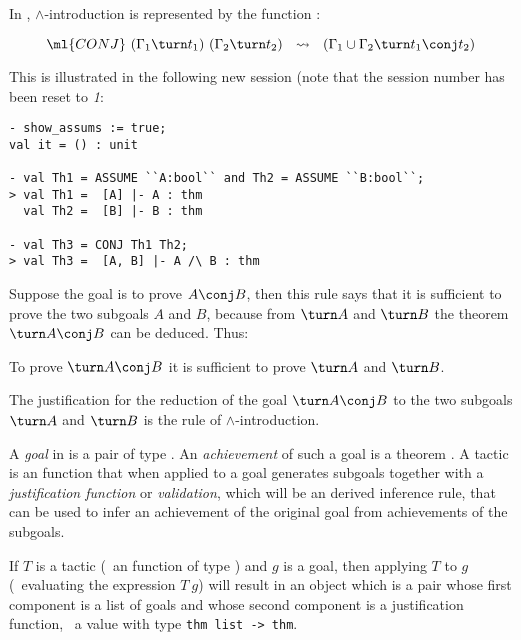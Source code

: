 \noindent In \HOL,  $\wedge$-introduction is  represented by  the \ML{} function
:

\[\ml{CONJ}\ (\Gamma_1\turn t_1)\ (\Gamma_2\turn t_2) \ \ \leadsto\
\ (\Gamma_1\cup\Gamma_2\turn  t_1\conj  t_2)\]

\noindent  This  is   illustrated  in  the
following new session (note that the session number has been reset to
{\small\sl 1}:

\setcounter{sessioncount}{0}
\begin{session}
\begin{verbatim}
- show_assums := true;
val it = () : unit

- val Th1 = ASSUME ``A:bool`` and Th2 = ASSUME ``B:bool``;
> val Th1 =  [A] |- A : thm
  val Th2 =  [B] |- B : thm

- val Th3 = CONJ Th1 Th2;
> val Th3 =  [A, B] |- A /\ B : thm
\end{verbatim}
\end{session}

    Suppose the goal is to prove $A\conj B$, then this rule says that
    it is sufficient to prove the two subgoals $A$ and $B$, because
    from $\turn A$ and $\turn B$ the theorem $\turn A\conj B$ can be
    deduced. Thus:

\begin{myenumerate}
\item To prove $\turn A \conj B$ it is sufficient to
      prove $\turn A$ and $\turn B$.
\item The justification for the reduction of the
goal  $\turn A \conj B$  to the two  subgoals  $\turn A$
and $\turn B$ is the rule of $\wedge$-introduction.
\end{myenumerate}

A \emph{goal} in \HOL{} is a pair  of \ML{} type .
An \emph{achievement} of such a goal is a theorem \ml{$t_1$,$\ldots$,$t_n$\ |-\ $t$}.
A tactic is an \ML{} function that when applied to a goal generates subgoals together with a \emph{justification function} or {\it validation\/}, which will be an \ML{} derived inference rule, that can be used to infer an achievement of the original goal from achievements of the subgoals.

If $T$ is a tactic (\ie\ an \ML{} function of type ) and $g$ is a goal, then applying $T$ to
$g$ (\ie\ evaluating the \ML{} expression $T\ g$) will result in an
object which is a pair whose first component is a list of goals and
whose second component is a justification function, \ie\ a value with
\ML{} type {\small\verb|thm list -> thm|}.

